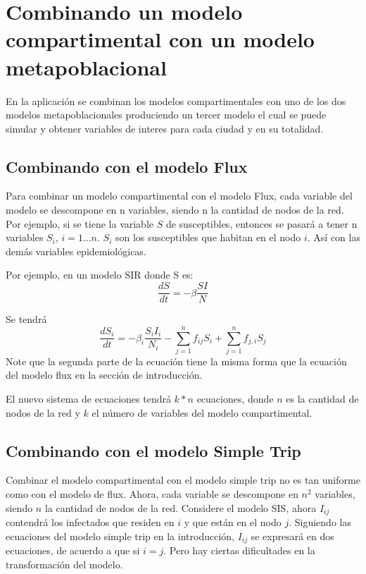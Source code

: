 \documentclass[a4paper,10pt,twocolumn]{article}
\begin{document}
\section{Combinando un modelo compartimental con un modelo metapoblacional}

En la aplicaci\'on se combinan los modelos compartimentales con uno de los dos modelos metapoblacionales produciendo un tercer modelo el cual se puede simular y obtener variables de interes para cada ciudad y en su totalidad. 

\subsection{Combinando con el modelo Flux}

Para combinar un modelo compartimental con el modelo Flux, cada variable del modelo se descompone en n variables, siendo n la cantidad de nodos de la red. Por ejemplo, si se tiene la variable $S$ de susceptibles, entonces se pasar\'a a tener n variables $S_i$, $i=1...n$. $S_i$ son los susceptibles que habitan en el nodo $i$. As\'i con las dem\'as variables epidemiol\'ogicas.

Por ejemplo, en un modelo SIR donde S es:
$$
	\frac{dS}{dt} = - \beta \frac{SI}{N}	
$$

Se tendr\'a
$$
	\frac{dS_i}{dt} = - \beta_i \frac{S_iI_i}{N_i} - \sum_{j=1}^{n}f_{ij}S_i + \sum_{j=1}^{n} f_{j,i}S_j 
$$
Note que la segunda parte de la ecuaci\'on tiene la misma forma que la ecuaci\'on del modelo flux en la secci\'on de introducci\'on.

El nuevo sistema de ecuaciones tendr\'a $k*n$ ecuaciones, donde $n$ es la cantidad de nodos de la red y $k$ el n\'umero de variables del modelo compartimental. 


\subsection{Combinando con el modelo Simple Trip}

Combinar el modelo compartimental con el modelo simple trip no es tan uniforme como con el modelo de flux. Ahora, cada variable se descompone en $n^2$ variables, siendo $n$ la cantidad de nodos de la red. Considere el modelo SIS, ahora $I_{ij}$ contendr\'a los infectados que residen en $i$ y que est\'an en el nodo $j$. Siguiendo las ecuaciones del modelo simple trip en la introducci\'on, $I_{ij}$ se expresar\'a en dos ecuaciones, de acuerdo a que si $i = j$. Pero hay ciertas dificultades en la transformaci\'on del modelo.
\end{document}
